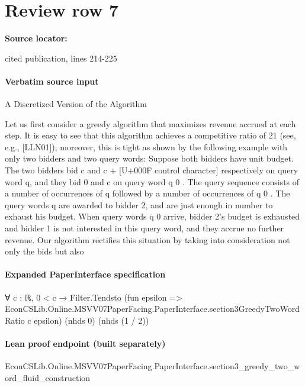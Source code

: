 \documentclass[10pt]{article}
\begin{document}
\section*{Review row 7}
\textbf{Source locator:} {\footnotesize\raggedright cited publication, lines 214-\allowbreak{}225\par}
\paragraph{Verbatim source input}
\begin{ReviewVerbatim}
A Discretized Version of the Algorithm

Let us first consider a greedy algorithm that maximizes revenue accrued at each step. It is
easy to see that this algorithm achieves a competitive ratio of 21 (see, e.g., [LLN01]); moreover,
this is tight as shown by the following example with only two bidders and two query words:
Suppose both bidders have unit budget. The two bidders bid c and c + [U+000F control character] respectively on query
word q, and they bid 0 and c on query word q 0 . The query sequence consists of a number of
occurrences of q followed by a number of occurrences of q 0 . The query words q are awarded to
bidder 2, and are just enough in number to exhaust his budget. When query words q 0 arrive,
bidder 2’s budget is exhausted and bidder 1 is not interested in this query word, and they
accrue no further revenue.
Our algorithm rectifies this situation by taking into consideration not only the bids but also
\end{ReviewVerbatim}


\paragraph{Expanded PaperInterface specification}
\begin{ReviewVerbatim}
∀ {c : ℝ},
  0 < c →
    Filter.Tendsto
      (fun epsilon => EconCSLib.Online.MSVV07PaperFacing.PaperInterface.section3GreedyTwoWordRatio c epsilon) (nhds 0)
      (nhds (1 / 2))
\end{ReviewVerbatim}

\paragraph{Lean proof endpoint (built separately)}\begin{ReviewVerbatim}
EconCSLib.Online.MSVV07PaperFacing.PaperInterface.section3_greedy_two_word_fluid_construction
\end{ReviewVerbatim}
\end{document}
